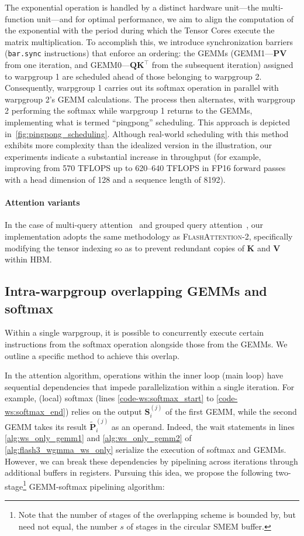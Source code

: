 The exponential operation is handled by a distinct hardware unit—the multi-function unit—and for optimal performance, we aim to align the computation of the exponential with the period during which the Tensor Cores execute the matrix multiplication. To accomplish this, we introduce synchronization barriers (\texttt{bar.sync} instructions) that enforce an ordering: the GEMMs (GEMM1—$\mathbf{P} \mathbf{V}$ from one iteration, and GEMM0—$\mathbf{Q} \mathbf{K}^\top$ from the subsequent iteration) assigned to warpgroup 1 are scheduled ahead of those belonging to warpgroup 2. Consequently, warpgroup 1 carries out its softmax operation in parallel with warpgroup 2’s GEMM calculations. The process then alternates, with warpgroup 2 performing the softmax while warpgroup 1 returns to the GEMMs, implementing what is termed “pingpong” scheduling. This approach is depicted in~\cref{fig:pingpong_scheduling}. Although real-world scheduling with this method exhibits more complexity than the idealized version in the illustration, our experiments indicate a substantial increase in throughput (for example, improving from 570 TFLOPS up to 620–640 TFLOPS in FP16 forward passes with a head dimension of 128 and a sequence length of 8192).

\paragraph{Attention variants} In the case of multi-query attention~\citep{shazeer2019fast} and grouped query attention~\citep{ainslie2023gqa}, our implementation adopts the same methodology as \textsc{FlashAttention-2}, specifically modifying the tensor indexing so as to prevent redundant copies of $\mathbf{K}$ and $\mathbf{V}$ within HBM.

\subsection{Intra-warpgroup overlapping GEMMs and softmax}

Within a single warpgroup, it is possible to concurrently execute certain instructions from the softmax operation alongside those from the GEMMs. We outline a specific method to achieve this overlap.

In the attention algorithm, operations within the inner loop (main loop) have sequential dependencies that impede parallelization within a single iteration. For example, (local) softmax (lines \ref{code-ws:softmax_start} to \ref{code-ws:softmax_end}) relies on the output $\mathbf{S}_i^{(j)}$ of the first GEMM, while the second GEMM takes its result $\widetilde{\mathbf{P}}_i^{(j)}$ as an operand. Indeed, the wait statements in lines \ref{alg:ws_only_gemm1} and \ref{alg:ws_only_gemm2} of \cref{alg:flash3_wgmma_ws_only} serialize the execution of softmax and GEMMs. However, we can break these dependencies by pipelining across iterations through additional buffers in registers. Pursuing this idea, we propose the following two-stage\footnote{Note that the number of stages of the overlapping scheme is bounded by, but need not equal, the number $s$ of stages in the circular SMEM buffer.} GEMM-softmax pipelining algorithm:


